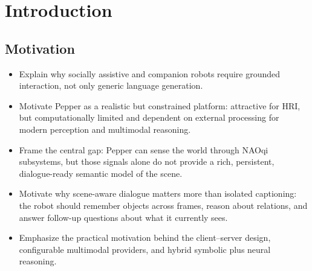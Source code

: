 \documentclass[
  digital,     %
  oneside,     %
  nosansbold,  %
  nocolorbold, %
  lof,         %
  lot,         %
]{fithesis4}
\begin{document}
\chapter{Introduction}

\section{Motivation}
\begin{itemize}
    \item Explain why socially assistive and companion robots require grounded interaction, not only generic language generation.
    \item Motivate Pepper as a realistic but constrained platform: attractive for HRI, but computationally limited and dependent on external processing for modern perception and multimodal reasoning.
    \item Frame the central gap: Pepper can sense the world through NAOqi subsystems, but those signals alone do not provide a rich, persistent, dialogue-ready semantic model of the scene.
    \item Motivate why scene-aware dialogue matters more than isolated captioning: the robot should remember objects across frames, reason about relations, and answer follow-up questions about what it currently sees.
    \item Emphasize the practical motivation behind the client--server design, configurable multimodal providers, and hybrid symbolic plus neural reasoning.
\end{itemize}
\end{document}
